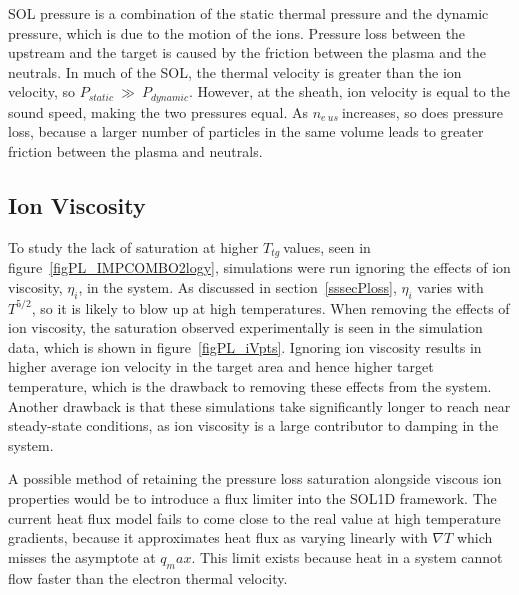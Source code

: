 \documentclass[12pt]{article}  %
\providecommand{\neus}{$n_{e~us}~$} %
\providecommand{\Ttg}{$T_{tg}~$} %
\begin{document}
SOL pressure is a combination of the static thermal pressure and the dynamic pressure, which is due to the motion of the ions. Pressure loss between the upstream and the target is caused by the friction between the plasma and the neutrals. In much of the SOL, the thermal velocity is greater than the ion velocity, so $P_{static}~\gg~P_{dynamic}$. However, at the sheath, ion velocity is equal to the sound speed, making the two pressures equal. As \neus increases, so does pressure loss, because a larger number of particles in the same volume leads to greater friction between the plasma and neutrals.


\subsection{Ion Viscosity}\label{ssecIonviscosity}
To study the lack of saturation at higher \Ttg values, seen in figure~\ref{figPL_IMPCOMBO2logy}, simulations were run ignoring the effects of ion viscosity, $\eta_i$, in the system. As discussed in section~\ref{sssecPloss}, $\eta_i$ varies with $T^{5/2}$, so it is likely to blow up at high temperatures. When removing the effects of ion viscosity, the saturation observed experimentally is seen in the simulation data, which is shown in figure~\ref{figPL_iVpts}. Ignoring ion viscosity results in higher average ion velocity in the target area and hence higher target temperature, which is the drawback to removing these effects from the system. Another drawback is that these simulations take significantly longer to reach near steady-state conditions, as ion viscosity is a large contributor to damping in the system.

A possible method of retaining the pressure loss saturation alongside viscous ion properties would be to introduce a flux limiter into the SOL1D framework. The current heat flux model \cite{Braginskii1965} fails to come close to the real value at high temperature gradients, because it approximates heat flux as varying linearly with $\nabla T$ which misses the asymptote at $q_max$. This limit exists because heat in a system cannot flow faster than the electron thermal velocity.
\end{document}
